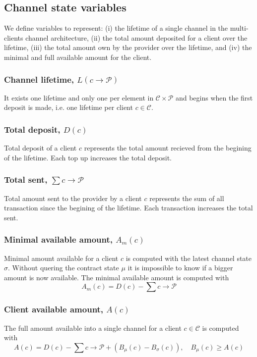 \documentclass{llncs}
\begin{document}
\subsection{Channel state variables} We define variables to represent: (i) the lifetime of a single channel in the multi-clients channel architecture, (ii) the total amount deposited for a client over the lifetime, (iii) the total amount own by the provider over the lifetime, and (iv) the minimal and full available amount for the client.

\subsubsection{Channel lifetime, $L(c \rightarrow \mathcal{P})$} It exists one lifetime and only one per element in $\mathcal{C} \times \mathcal{P}$ and begins when the first deposit is made, i.e. one lifetime per client $c \in \mathcal{C}$.

\subsubsection{Total deposit, $D(c)$} Total deposit of a client $c$ represents the total amount recieved from the begining of the lifetime. Each top up increases the total deposit.

\subsubsection{Total sent, $\sum c \rightarrow \mathcal{P}$} Total amount sent to the provider by a client $c$ represents the sum of all transaction since the begining of the lifetime. Each transaction increases the total sent.

\subsubsection{Minimal available amount, $A_m(c)$} Minimal amount available for a client $c$ is computed with the latest channel state $\sigma$. Without quering the contract state $\mu$ it is impossible to know if a bigger amount is now available. The minimal available amount is computed with
$$A_m(c) = D(c) - \textstyle \sum c \rightarrow \mathcal{P}$$

\subsubsection{Client available amount, $A(c)$} The full amount available into a single channel for a client $c \in \mathcal{C}$ is computed with
$$A(c) = D(c) - \textstyle \sum c \rightarrow \mathcal{P} + (B_\mu(c) - B_\sigma(c)), \quad B_\mu(c) \geq A(c)$$
\end{document}
